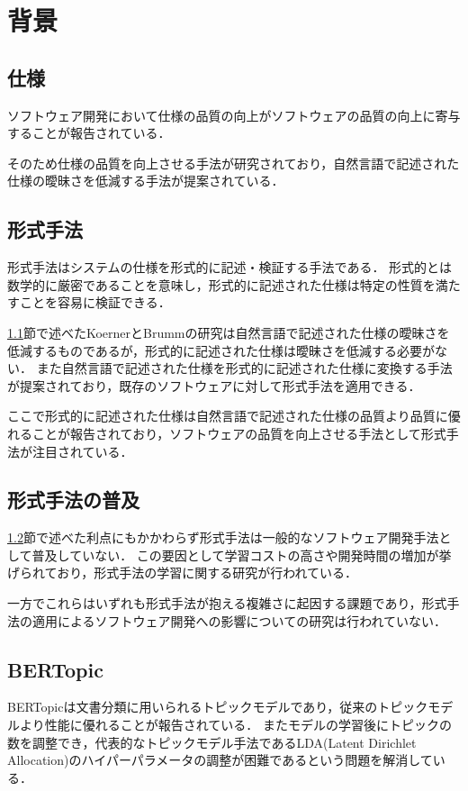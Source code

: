\documentclass[main]{subfiles}
\begin{document}
\chapter{背景}

\section{仕様}
\label{sec:specification}

ソフトウェア開発において仕様の品質の向上がソフトウェアの品質の向上に寄与することが報告されている\cite{knauss:2009}．

そのため仕様の品質を向上させる手法が研究されており，自然言語で記述された仕様の曖昧さを低減する手法が提案されている\cite{koerner:2011}．

\section{形式手法}
\label{sec:formal-method}

形式手法はシステムの仕様を形式的に記述・検証する手法である．
形式的とは数学的に厳密であることを意味し，形式的に記述された仕様は特定の性質を満たすことを容易に検証できる．

\ref{sec:specification}節で述べたKoernerとBrummの研究は自然言語で記述された仕様の曖昧さを低減するものであるが，形式的に記述された仕様は曖昧さを低減する必要がない．
また自然言語で記述された仕様を形式的に記述された仕様に変換する手法が提案されており\cite{ilieva:2005}，既存のソフトウェアに対して形式手法を適用できる．

ここで形式的に記述された仕様は自然言語で記述された仕様の品質より品質に優れることが報告されており\cite{fabbrini:2001}，ソフトウェアの品質を向上させる手法として形式手法が注目されている．%

\section{形式手法の普及}

\ref{sec:formal-method}節で述べた利点にもかかわらず形式手法は一般的なソフトウェア開発手法として普及していない．
この要因として学習コストの高さ\cite{kurita:2011}や開発時間の増加\cite{kitamura:2021}が挙げられており，形式手法の学習に関する研究が行われている\cite{ohnishi:2020,araki:2010,araki:2011}．

一方でこれらはいずれも形式手法が抱える複雑さに起因する課題であり，形式手法の適用によるソフトウェア開発への影響についての研究は行われていない．

\section{BERTopic}

BERTopicは文書分類に用いられるトピックモデルであり，従来のトピックモデルより性能に優れることが報告されている\cite{egger:2022}．
またモデルの学習後にトピックの数を調整でき，代表的なトピックモデル手法であるLDA(Latent Dirichlet Allocation)のハイパーパラメータの調整が困難であるという問題を解消している．
\end{document}
